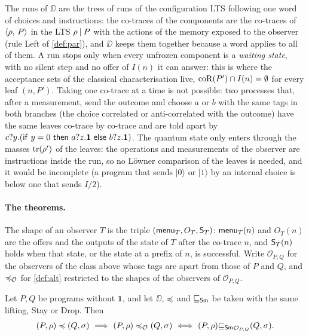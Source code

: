 The runs of $\DD$ are the trees of runs of the configuration LTS following
one word of choices and instructions: the co-traces of the components are
the co-traces of $\langle \rho ,\, P \rangle$ in the LTS $\rho \mathbin{|} P$ with the actions
of the memory exposed to the observer (rule Left of \cref{def:par}), and
$\DD$ keeps them together because a word applies to all of them. A run
stops only when every unfrozen component is a \emph{waiting state}, with no
silent step and no offer of $I(n)$ it can answer: this is where the
acceptance sets of the classical characterisation live, $\mathrm{coR}(P') \cap I(n)
= \emptyset$ for every leaf $(n, P')$. Taking one co-trace at a time is not
possible: two processes that, after a measurement, send the outcome and
choose $a$ or $b$ with the same tags in both branches (the choice correlated
or anti-correlated with the outcome) have the same leaves co-trace by
co-trace and are told apart by $c?y.(\mathsf{if}\ y=0\ \mathsf{then}\ a?z.\mathbf{1}\ \mathsf{else}\ b?z.\mathbf{1})$.
The quantum state only enters through the masses $\mathrm{tr}(\rho')$ of the leaves:
the operations and measurements of the observer are instructions inside the
run, so no Löwner comparison of the leaves is needed, and it would be
incomplete (a program that sends $|0\rangle$ or $|1\rangle$ by an internal
choice is below one that sends $I/2$).

\paragraph{The theorems.} The shape of an observer $T$ is the triple
$(\mathsf{menu}_T, O_T, \mathsf{S}_T)$: $\mathsf{menu}_T(n)$ and $O_T(n)$ are the offers and
the outputs of the state of $T$ after the co-trace $n$, and $\mathsf{S}_T(n)$
holds when that state, or the state at a prefix of $n$, is successful. Write $\mathcal{O}_{P,Q}$ for the
observers of the class above whose tags are apart from those of $P$ and
$Q$, and $\preccurlyeq_{\mathcal{O}}$ for \cref{def:alt} restricted to the shapes of
the observers of $\mathcal{O}_{P,Q}$.

\begin{theorem}\label{thm:char}
Let $P, Q$ be programs without $\mathbf{1}$, and let $\DD$, $\preccurlyeq$ and
$\sqsubseteq_{\mathsf{Sm}}$ be taken with the same lifting, Stay or Drop. Then
\[
(P,\rho) \preccurlyeq (Q,\sigma)
\ \Longrightarrow\
(P,\rho) \preccurlyeq_{\mathcal{O}} (Q,\sigma)
\ \Longleftrightarrow\
(P,\rho) {\sqsubseteq_{\mathsf{Sm}}}_{\mathcal{O}_{P,Q}} (Q,\sigma).
\]
\end{theorem}


